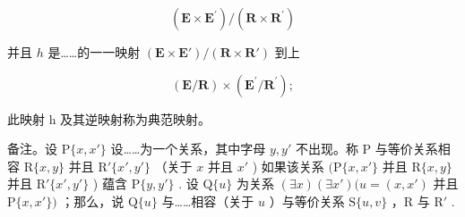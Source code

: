 \[
(\mathbf {E} \times \mathbf {E} ^ {\prime}) / (\mathbf {R} \times \mathbf {R} ^ {\prime})
\]

并且 \(h\) 是……的一一映射 \((\mathbf{E} \times \mathbf{E}') / (\mathbf{R} \times \mathbf{R}')\) 到上

\[
(\mathbf {E} / \mathbf {R}) \times (\mathbf {E} ^ {\prime} / \mathbf {R} ^ {\prime});
\]

此映射 h 及其逆映射称为典范映射。

备注。设 \(\mathrm{P}\{x, x'\}\) 设……为一个关系，其中字母 \(y, y'\) 不出现。称 P 与等价关系相容 \(\mathrm{R}\{x, y\}\) 并且 \(\mathrm{R}'\{x', y'\}\) （关于 \(x\) 并且 \(x'\) ) 如果该关系 \((\mathrm{P}\{x, x'\}\) 并且 \(\mathrm{R}\{x, y\}\) 并且 \(\mathrm{R}'\{x', y'\}\) ) 蕴含 \(\mathrm{P}\{y, y'\}\) . 设 \(\mathrm{Q}\{u\}\) 为关系 \((\exists x)(\exists x')(u = (x, x')\) 并且 \(\mathrm{P}\{x, x'\})\) ；那么，说 \(\mathrm{Q}\{u\}\) 与……相容（关于 \(u\) ）与等价关系 \(\mathrm{S}\{u, v\}\) ，R 与 \(\mathrm{R}'\) .

